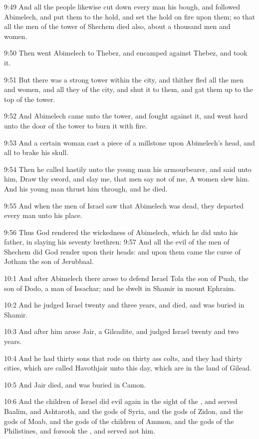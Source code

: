 9:49 And all the people likewise cut down every man his bough, and followed Abimelech, and put them to the hold, and set the hold on fire upon them; so that all the men of the tower of Shechem died also, about a thousand men and women.

9:50 Then went Abimelech to Thebez, and encamped against Thebez, and took it.

9:51 But there was a strong tower within the city, and thither fled all the men and women, and all they of the city, and shut it to them, and gat them up to the top of the tower.

9:52 And Abimelech came unto the tower, and fought against it, and went hard unto the door of the tower to burn it with fire.

9:53 And a certain woman cast a piece of a millstone upon Abimelech's head, and all to brake his skull.

9:54 Then he called hastily unto the young man his armourbearer, and said unto him, Draw thy sword, and slay me, that men say not of me, A women slew him. And his young man thrust him through, and he died.

9:55 And when the men of Israel saw that Abimelech was dead, they departed every man unto his place.

9:56 Thus God rendered the wickedness of Abimelech, which he did unto his father, in slaying his seventy brethren: 9:57 And all the evil of the men of Shechem did God render upon their heads: and upon them came the curse of Jotham the son of Jerubbaal.

10:1 And after Abimelech there arose to defend Israel Tola the son of Puah, the son of Dodo, a man of Issachar; and he dwelt in Shamir in mount Ephraim.

10:2 And he judged Israel twenty and three years, and died, and was buried in Shamir.

10:3 And after him arose Jair, a Gileadite, and judged Israel twenty and two years.

10:4 And he had thirty sons that rode on thirty ass colts, and they had thirty cities, which are called Havothjair unto this day, which are in the land of Gilead.

10:5 And Jair died, and was buried in Camon.

10:6 And the children of Israel did evil again in the sight of the \LORD, and served Baalim, and Ashtaroth, and the gods of Syria, and the gods of Zidon, and the gods of Moab, and the gods of the children of Ammon, and the gods of the Philistines, and forsook the \LORD, and served not him.

